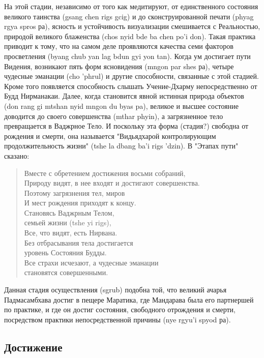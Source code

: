 На этой стадии, независимо от того как медитируют, от единственного состояния
великого таинства (gsang chen rigs gcig) и до сконструированной печати (phyag rgya spros
ра), ясность и устойчивость визуализации смешивается с Реальностью, природой великого
блаженства (chos nyid bde ba chen po'i don). Такая практика приводит к тому, что на самом
деле проявляются качества семи факторов просветления (byang chub yan lag bdun gyi yon tan).
Когда ум достигает пути Видения, возникают пять форм ясновидения (mngon par shes ра),
четыре чудесные эманации (cho 'phrul) и другие способности, связанные с этой стадией.
Кроме того появляется способность слышать Учение-Дхарму непосредственно от Будд
Нирманакаи. Далее, когда становится явной истинная природа объектов (don rang gi mtshan
nyid mngon du byas pa), великое и высшее состояние доводится до своего совершенства
(mthar phyin), а загрязненное тело превращается в Ваджрное Тело. И поскольку эта форма
(стадия?) свободна от рождения и смерти, она называется "Видьядхарой контролирующим
продолжительность жизни" (tshe la dbang ba'i rigs 'dzin). В "Этапах пути" сказано:

\begin{verse}
Вместе с обретением достижения восьми собраний,\\
Природу видят, в нее входят и достигают совершенства.\\
Поэтому загрязнения тел, миров\\
И мест рождения приходят к концу.\\
Становясь Ваджрным Телом, \\
семьей жизни (tshe yi rigs),\\
Все, что видят, есть Нирвана.\\
Без отбрасывания тела достигается \\
уровень Состояния Будды.\\
Все страхи исчезают, а чудесные эманации \\
становятся совершенными.
\end{verse}

Данная стадия осуществления (sgrub) подобна той, что великий ачарья
Падмасамбхава достиг в пещере Маратика, где Мандарава была его партнершей по практике,
и где он достиг состояния, свободного отрождения и смерти, посредством практики
непосредственной причины (nye rgyu'i spyod ра).

\subsection{Достижение}

